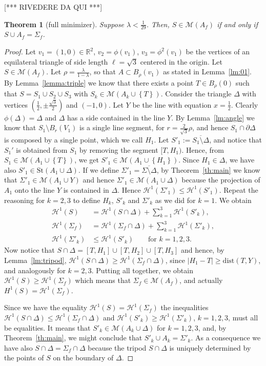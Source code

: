 \documentclass{amsart}
\newcommand{\RR}{\mathbb R}
\renewcommand{\H}{\mathcal H}
\newcommand{\abs}[1]{\left\vert #1 \right\vert}
\newcommand{\enclose}[1]{\left(#1\right)}
\newcommand{\ENCLOSE}[1]{\left\{#1\right\}}
\newcommand{\St}{\mathrm{St}}
\newcommand{\M}{\mathcal{M}}
\renewcommand{\H}{\mathcal{H}}
\newcommand{\dist}{\mathrm{dist}}
\newtheorem{theorem}{Theorem}[section]
\theoremstyle{definition}
\theoremstyle{remark}
\begin{document}
[*** RIVEDERE DA QUI ***]
\begin{theorem}[full minimizer]\label{th:full}
  Suppose $\lambda < \frac 1{29}$.
  Then, $S \in \M(A_f)$ if and only if $S\cup A_f = \Sigma_f$.
\end{theorem}
\begin{proof}
  Let $v_1 = (1,0)\in \RR^2$, $v_2=\phi(v_1)$, $v_3=\phi^2(v_1)$ 
  be the vertices of an equilateral 
  triangle of side length $\ell = \sqrt 3$ centered in the origin.
  Let $S\in \M(A_f)$.
  Let $\rho = \frac{\lambda}{1-\lambda}$, so that $A\subset B_\rho(v_1)$ as 
  stated in Lemma~\ref{lm:01}.
  By Lemma~\ref{lemma:triple} we know that there exists a point 
  $T\in B_\rho(0)$ such that $S=S_1\cup S_2\cup S_3$ with $S_k\in \M(A_k\cup \ENCLOSE{T})$.
  Consider the triangle $\Delta$ 
  with vertices $\enclose{\frac 1 2,\pm\frac{\sqrt 3}{2}}$ and $\enclose{-1,0}$.
  Let $Y$ be the line with equation $x=\frac 1 2$.
  Clearly $\phi(\Delta)=\Delta$ and $\Delta$ has a side contained in the line $Y$. 
  By Lemma~\ref{lm:angle} we know that $S_1\setminus B_r(V_1)$ is a single line segment,
  for $r=\frac 2 {\sqrt 3} \rho$,
  and hence $S_1\cap \partial \Delta$ is composed by a single point, 
  which we call $H_1$. 
  Let $S'_1 := \overline{S_1\setminus \Delta}$, and notice that
  $S_1'$ is obtained from $S_1$ by removing the segment $[T,H_1)$.
  Hence, from $S_1\in \M(A_1\cup \ENCLOSE{T})$, we get $S'_1\in \M(A_1\cup \ENCLOSE{H_1})$. 
  Since $H_1\in \Delta$, we have also $S'_1\in \St(A_1 \cup \Delta)$.
  If we define $\Sigma'_1 = \overline{\Sigma\setminus \Delta}$,
  by Theorem~\ref{th:main} we know that $\Sigma'_1 \in \M(A_1\cup Y)$ 
  and hence $\Sigma'_1 \in \M(A_1\cup \Delta)$ because the projection of $A_1$ onto the line 
  $Y$ is contained in $\Delta$. 
  Hence $\H^1(\Sigma'_1)\le \H^1(S'_1)$.
  Repeat the reasoning for $k=2,3$ to define $H_k$, $S'_k$ and $\Sigma'_k$
  as we did for $k=1$.
  We obtain
  \begin{align*}
    \H^1(S) &= \H^1(S\cap \Delta) + \sum_{k=1}^3 \H^1(S'_k),\\
    \H^1(\Sigma_f) &= \H^1(\Sigma_f\cap \Delta) + \sum_{k=1}^3 \H^1(\Sigma'_k),\\
    \H^1(\Sigma'_k) & \le \H^1(S'_k) \qquad \text{for $k=1,2,3$}.
  \end{align*}
  Now notice that $S\cap \Delta = [T,H_1]\cup [T,H_2]\cup [T,H_3]$
  and hence, by Lemma~\ref{lm:tripod}, $\H^1(S\cap \Delta) \ge \H^1(\Sigma_f\cap \Delta)$,
  since $\abs{H_1 - T}\ge \dist(T,Y)$, and analogously for $k=2,3$.
  Putting all together, we obtain $\H^1(S)\ge \H^1(\Sigma_f)$
  which means that $\Sigma_f\in \M(A_f)$, and actually $H^1(S)=\H^1(\Sigma_f)$.

  Since we have the equality $\H^1(S)=\H^1(\Sigma_f)$ the inequalities 
  $\H^1(S\cap \Delta)\le \H^1(\Sigma_f\cap \Delta)$ and
  $\H^1(S'_k)\ge \H^1(\Sigma'_k)$, $k=1,2,3$, must all be equalities.
  It means that $S'_k\in \M(A_k\cup \Delta)$ for $k=1,2,3$, and,
  by Theorem~\ref{th:main}, we might conclude that $S'_k\cup A_k = \Sigma'_k$.
  As a consequence we have also $S\cap \Delta = \Sigma_f\cap \Delta$ because 
  the tripod $S\cap \Delta$ is uniquely determined by the points of $S$ on 
  the boundary of $\Delta$.
\end{proof}
\end{document}
